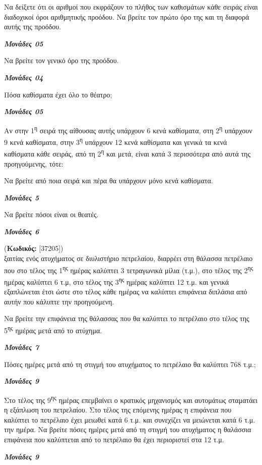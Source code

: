 \documentclass[11pt,a4paper,twoside]{book}
\newcounter{askhsh}[chapter]
\renewcommand{\theaskhsh}{
	\bf{\titlefont{\Large{\thechapter}}.\arabic{askhsh}}
}
\newcommand{\Askhsh}[2]{\refstepcounter{askhsh}{\titlefont{Άσκηση\theaskhsh} - \textcolor{maincolor}{ΘΕΜΑ #2}} (\small{\textbf{Κωδικός:} #1})\\}{}
\newcommand{\monades}[1]{
\hspace*{\fill}
\textbf{\textit{\textcolor{maincolor}{Μονάδες #1}}}}
\begin{document}
\begin{alist}
\item Να δείξετε ότι οι αριθμοί που εκφράζουν το πλήθος των καθισμάτων κάθε σειράς είναι διαδοχικοί όροι αριθμητικής προόδου. Να βρείτε τον πρώτο όρο της και τη διαφορά αυτής της προόδου.
\monades{05}
\item Να βρείτε τον γενικό όρο της προόδου.
\monades{04}
\item Πόσα καθίσματα έχει όλο το θέατρο;
\monades{05}
\item Αν στην 1\textsuperscript{η} σειρά της αίθουσας αυτής υπάρχουν 6 κενά καθίσματα, στη 2\textsuperscript{η} υπάρχουν 9 κενά καθίσματα, στην 3\textsuperscript{η} υπάρχουν 12 κενά καθίσματα και γενικά τα κενά καθίσματα κάθε σειράς, από τη 2\textsuperscript{η} και μετά, είναι κατά 3 περισσότερα από αυτά της προηγούμενης, τότε:
\begin{rlist}
\item
  Να βρείτε από ποια σειρά και πέρα θα υπάρχουν μόνο κενά καθίσματα.
\monades{5}
\item
  Να βρείτε πόσοι είναι οι θεατές.
\monades{6}
\end{rlist}
\end{alist}
\vspace{4mm}

\Askhsh{[37205]}
Εξαιτίας ενός ατυχήματος σε διυλιστήριο πετρελαίου, διαρρέει στη θάλασσα πετρέλαιο που στο τέλος της 1\textsuperscript{ης} ημέρας καλύπτει 3 τετραγωνικά μίλια (τ.μ.), στο τέλος της 2\textsuperscript{ης} ημέρας καλύπτει 6 τ.μ, στο τέλος της 3\textsuperscript{ης} ημέρας καλύπτει 12 τ.μ. και γενικά εξαπλώνεται έτσι ώστε στο τέλος κάθε ημέρας να καλύπτει επιφάνεια διπλάσια από αυτήν που κάλυπτε την προηγούμενη.

\begin{alist}
\item Να βρείτε την επιφάνεια της θάλασσας που θα καλύπτει το πετρέλαιο στο τέλος της 5\textsuperscript{ης} ημέρας μετά από το ατύχημα.
\monades{7}
\item Πόσες ημέρες μετά από τη στιγμή του ατυχήματος το πετρέλαιο θα καλύπτει 768 τ.μ.;

\monades{9}
\item Στο τέλος της 9\textsuperscript{ης} ημέρας επεμβαίνει ο κρατικός μηχανισμός και αυτομάτως σταματάει η εξάπλωση του πετρελαίου. Στο τέλος της επόμενης ημέρας η επιφάνεια που καλύπτει το πετρέλαιο έχει μειωθεί κατά 6 τ.μ. και συνεχίζει να μειώνεται κατά 6 τ.μ. την ημέρα. Να βρείτε πόσες ημέρες μετά από τη στιγμή του ατυχήματος η θαλάσσια επιφάνεια που καλύπτεται από το πετρέλαιο θα έχει περιοριστεί στα 12 τ.μ.

\monades{9}
\end{alist}
\end{document}
